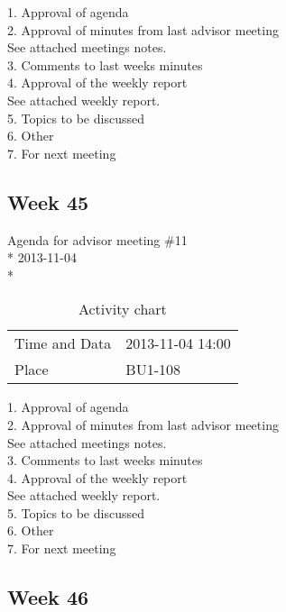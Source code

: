 1. Approval of agenda \\
2. Approval of minutes from last advisor meeting \\
See attached meetings notes. \\
3. Comments to last weeks minutes \\
4. Approval of the weekly report \\
See attached weekly report. \\
5. Topics to be discussed \\
6. Other \\
7. For next meeting \\

\newpage
\subsection{Week 45}

\begin{center}
Agenda for advisor meeting \#11\\*
2013-11-04\\*
\end{center}

\begin{table}[H]
\begin{center}
\begin{tabular}{ l | l }
Time and Data & 2013-11-04 14:00 \\
Place & BU1-108 \\
\end{tabular}
\end{center}
\caption{Activity chart}
\label{table:activityChartAdvisorAgendaWeek45}
\end{table}


1. Approval of agenda \\
2. Approval of minutes from last advisor meeting \\
See attached meetings notes. \\
3. Comments to last weeks minutes \\
4. Approval of the weekly report \\
See attached weekly report. \\
5. Topics to be discussed \\
6. Other \\
7. For next meeting \\

\newpage
\subsection{Week 46}

